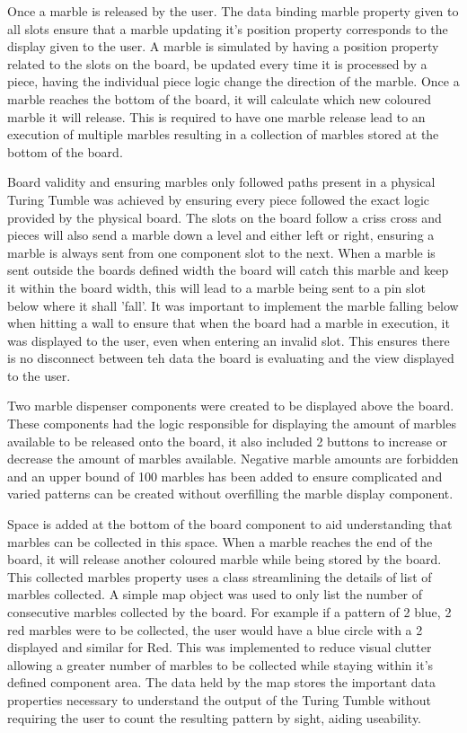 \documentclass{l4proj}
\begin{document}
Once a marble is released by the user. The data binding marble property given to all slots ensure that a marble updating it's position property corresponds to the display given to the user. A marble is simulated by having a position property related to the slots on the board, be updated every time it is processed by a piece, having the individual piece logic change the direction of the marble. Once a marble reaches the bottom of the board, it will calculate which new coloured marble it will release. This is required to have one marble release lead to an execution of multiple marbles resulting in a collection of marbles stored at the bottom of the board. 

Board validity and ensuring marbles only followed paths present in a physical Turing Tumble was achieved by ensuring every piece followed the exact logic provided by the physical board. The slots on the board follow a criss cross and pieces will also send a marble down a level and either left or right, ensuring a marble is always sent from one component slot to the next. When a marble is sent outside the boards defined width the board will catch this marble and keep it within the board width, this will lead to a marble being sent to a pin slot below where it shall 'fall'. It was important to implement the marble falling below when hitting a wall to ensure that when the board had a marble in execution, it was displayed to the user, even when entering an invalid slot. This ensures there is no disconnect between teh data the board is evaluating and the view displayed to the user.

Two marble dispenser components were created to be displayed above the board. These components had the logic responsible for displaying the amount of marbles available to be released onto the board, it also included 2 buttons to increase or decrease the amount of marbles available. Negative marble amounts are forbidden and an upper bound of 100 marbles has been added to ensure complicated and varied patterns can be created without overfilling the marble display component.

Space is added at the bottom of the board component to aid understanding that marbles can be collected in this space. When a marble reaches the end of the board, it will release another coloured marble while being stored by the board. This collected marbles property uses a class streamlining the details of list of marbles collected. A simple map object was used to only list the number of consecutive marbles collected by the board. For example if a pattern of 2 blue, 2 red marbles were to be collected, the user would have a blue circle with a 2 displayed and similar for Red. This was implemented to reduce visual clutter allowing a greater number of marbles to be collected while staying within it's defined component area. The data held by the map stores the important data properties necessary to understand the output of the Turing Tumble without requiring the user to count the resulting pattern by sight, aiding useability.   
\end{document}

